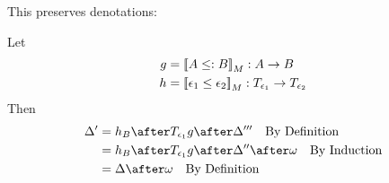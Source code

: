 \documentclass{report}
\begin{document}
This preserves denotations:

Let
\begin{align}
    g &= {\bf [\![}A \leq: B{\bf ]\!]}_M: A \rightarrow B\\
    h &= {\bf [\![}\epsilon_1\leq\epsilon_2{\bf ]\!]}_M: T_{\epsilon_1}{}\rightarrow T_{\epsilon_2}{}
\end{align}
Then
\begin{align}
    \D' & = h_B\after\T{\e_1}{g}\after \D''' \qt{By Definition}\\
    & = h_B\after\T{\e_1}{g}\after \D''\after\w\qt{By Induction}\\
    & = \D\after\w\qt{By Definition}
\end{align}
\end{document}
